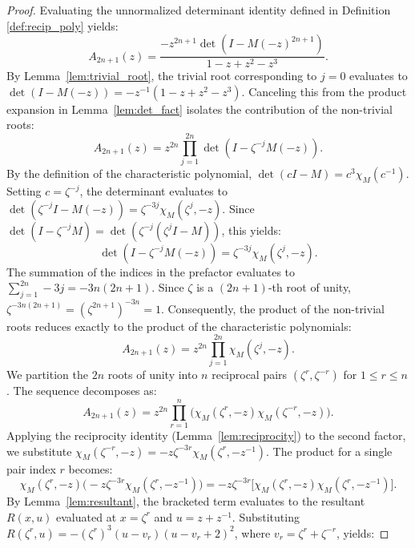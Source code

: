 \documentclass[10pt,a4paper]{amsart}
\begin{document}
\begin{proof}
Evaluating the unnormalized determinant identity defined in Definition \ref{def:recip_poly} yields:
\begin{equation*}
A_{2n+1}(z) = \frac{-z^{2n+1} \det(I - M(-z)^{2n+1})}{1-z+z^2-z^3}.
\end{equation*}
By Lemma~\ref{lem:trivial_root}, the trivial root corresponding to $j=0$ evaluates to $\det(I-M(-z)) = -z^{-1}(1-z+z^2-z^3)$. Canceling this from the product expansion in Lemma~\ref{lem:det_fact} isolates the contribution of the non-trivial roots:
\begin{equation*}
A_{2n+1}(z) = z^{2n} \prod_{j=1}^{2n} \det(I - \zeta^{-j}M(-z)).
\end{equation*}
By the definition of the characteristic polynomial, $\det(cI - M) = c^3\chi_M(c^{-1})$. Setting $c = \zeta^{-j}$, the determinant evaluates to $\det(\zeta^{-j}I - M(-z)) = \zeta^{-3j}\chi_M(\zeta^j, -z)$. Since $\det(I - \zeta^{-j}M) = \det(\zeta^{-j}(\zeta^j I - M))$, this yields:
\begin{equation*}
\det(I - \zeta^{-j}M(-z)) = \zeta^{-3j}\chi_M(\zeta^j, -z).
\end{equation*}
The summation of the indices in the prefactor evaluates to $\sum_{j=1}^{2n} -3j = -3n(2n+1)$. Since $\zeta$ is a $(2n+1)$-th root of unity, $\zeta^{-3n(2n+1)} = (\zeta^{2n+1})^{-3n} = 1$. Consequently, the product of the non-trivial roots reduces exactly to the product of the characteristic polynomials:
\begin{equation*}
A_{2n+1}(z) = z^{2n} \prod_{j=1}^{2n} \chi_M(\zeta^j, -z).
\end{equation*}
We partition the $2n$ roots of unity into $n$ reciprocal pairs $(\zeta^r, \zeta^{-r})$ for $1 \le r \le n$. The sequence decomposes as:
\begin{equation*}
A_{2n+1}(z) = z^{2n} \prod_{r=1}^{n} \Big( \chi_M(\zeta^r, -z) \chi_M(\zeta^{-r}, -z) \Big).
\end{equation*}
Applying the reciprocity identity (Lemma~\ref{lem:reciprocity}) to the second factor, we substitute \newline
$\chi_M(\zeta^{-r}, -z) = -z\zeta^{-3r}\chi_M(\zeta^r, -z^{-1})$. The product for a single pair index $r$ becomes:
\begin{equation*}
\chi_M(\zeta^r, -z) \Big( -z\zeta^{-3r}\chi_M(\zeta^r, -z^{-1}) \Big) = -z\zeta^{-3r} \Big[ \chi_M(\zeta^r, -z)\chi_M(\zeta^r, -z^{-1}) \Big].
\end{equation*}
By Lemma~\ref{lem:resultant}, the bracketed term evaluates to the resultant $R(x, u)$ evaluated at $x = \zeta^r$ and $u = z + z^{-1}$. Substituting $R(\zeta^r, u) = -(\zeta^r)^3 (u - v_r)(u - v_r + 2)^2$, where $v_r = \zeta^r + \zeta^{-r}$, yields:

\end{proof}
\end{document}
